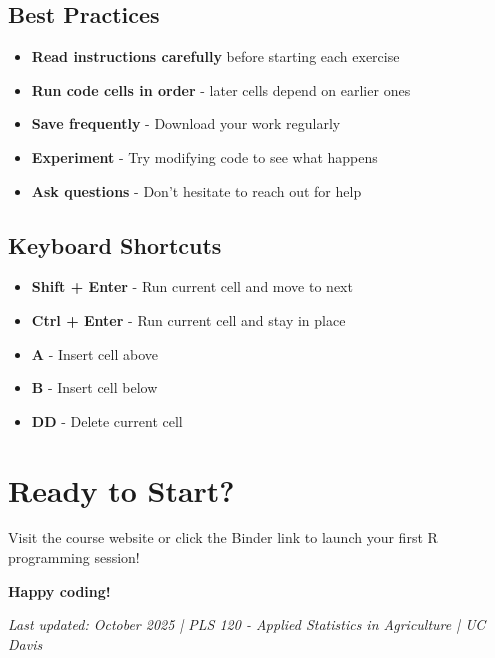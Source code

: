 \documentclass[11pt,a4paper]{article}
\begin{document}
\subsection{Best Practices}

\begin{itemize}
    \item \textbf{Read instructions carefully} before starting each exercise
    \item \textbf{Run code cells in order} - later cells depend on earlier ones
    \item \textbf{Save frequently} - Download your work regularly
    \item \textbf{Experiment} - Try modifying code to see what happens
    \item \textbf{Ask questions} - Don't hesitate to reach out for help
\end{itemize}

\subsection{Keyboard Shortcuts}

\begin{itemize}
    \item \textbf{Shift + Enter} - Run current cell and move to next
    \item \textbf{Ctrl + Enter} - Run current cell and stay in place
    \item \textbf{A} - Insert cell above
    \item \textbf{B} - Insert cell below
    \item \textbf{DD} - Delete current cell
\end{itemize}

\section{Ready to Start?}

Visit the course website or click the Binder link to launch your first R programming session!

\begin{center}
\textbf{Happy coding!}
\end{center}

\vfill

\begin{center}
\textit{Last updated: October 2025 | PLS 120 - Applied Statistics in Agriculture | UC Davis}
\end{center}
\end{document}
